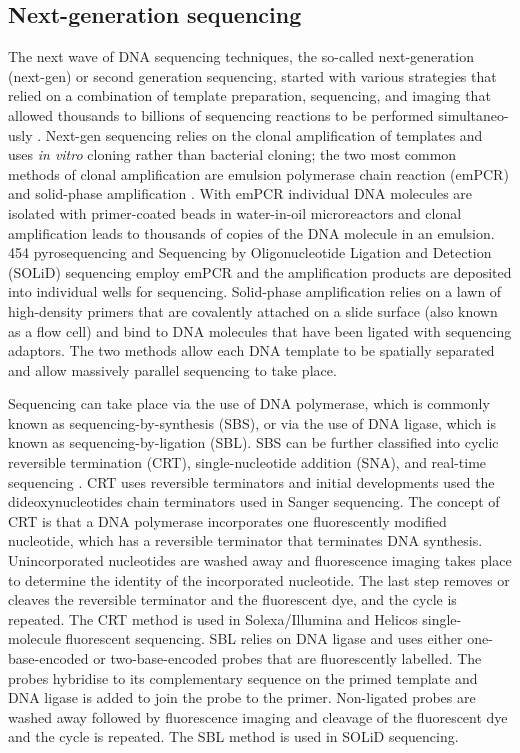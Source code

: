 \subsection{Next-generation sequencing}

The next wave of DNA sequencing techniques, the so-called next-generation (next-gen) or second generation sequencing, started with various strategies that relied on a combination of template preparation, sequencing, and imaging that allowed thousands to billions of sequencing reactions to be performed simultaneo-usly \citep{pmid19997069}. Next-gen sequencing relies on the clonal amplification of templates and uses \textit{in vitro} cloning rather than bacterial cloning; the two most common methods of clonal amplification are emulsion polymerase chain reaction (emPCR) \citep{pmid12857956} and solid-phase amplification \citep{pmid16473845}. With emPCR individual DNA molecules are isolated with primer-coated beads in water-in-oil microreactors and clonal amplification leads to thousands of copies of the DNA molecule in an emulsion. 454 pyrosequencing and Sequencing by Oligonucleotide Ligation and Detection (SOLiD) sequencing employ emPCR and the amplification products are deposited into individual wells for sequencing. Solid-phase amplification relies on a lawn of high-density primers that are covalently attached on a slide surface (also known as a flow cell) and bind to DNA molecules that have been ligated with sequencing adaptors. The two methods allow each DNA template to be spatially separated and allow massively parallel sequencing to take place.

Sequencing can take place via the use of DNA polymerase, which is commonly known as sequencing-by-synthesis (SBS), or via the use of DNA ligase, which is known as sequencing-by-ligation (SBL). SBS can be further classified into cyclic reversible termination (CRT), single-nucleotide addition (SNA), and real-time sequencing \citep{pmid19997069}. CRT uses reversible terminators and initial developments used the dideoxynucleotides chain terminators used in Sanger sequencing. The concept of CRT is that a DNA polymerase incorporates one fluorescently modified nucleotide, which has a reversible terminator that terminates DNA synthesis. Unincorporated nucleotides are washed away and fluorescence imaging takes place to determine the identity of the incorporated nucleotide. The last step removes or cleaves the reversible terminator and the fluorescent dye, and the cycle is repeated. The CRT method is used in Solexa/Illumina and Helicos single-molecule fluorescent sequencing. SBL relies on DNA ligase and uses either one-base-encoded or two-base-encoded probes that are fluorescently labelled. The probes hybridise to its complementary sequence on the primed template and DNA ligase is added to join the probe to the primer. Non-ligated probes are washed away followed by fluorescence imaging and cleavage of the fluorescent dye and the cycle is repeated. The SBL method is used in SOLiD sequencing.


